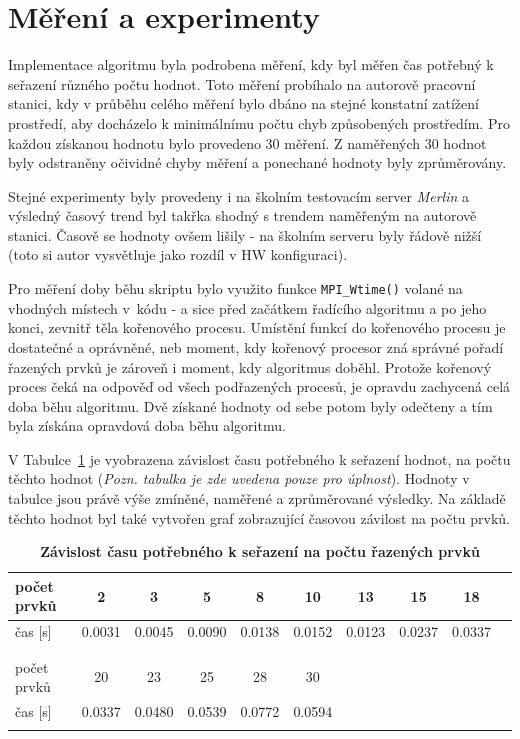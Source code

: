 \documentclass[a4paper,10pt]{article}
\begin{document}
	\section{Měření a experimenty}
	\label{sec:mereni}
		\par Implementace algoritmu byla podrobena měření, kdy byl měřen čas potřebný k seřazení různého počtu hodnot. Toto měření probíhalo na autorově pracovní stanici, kdy v průběhu celého měření bylo dbáno na stejné konstatní zatížení prostředí, aby docházelo k minimálnímu počtu chyb způsobených prostředím. Pro každou získanou hodnotu bylo provedeno 30 měření. Z naměřených 30 hodnot byly odstraněny očividné chyby měření a ponechané hodnoty byly zprůměrovány. 

		\par Stejné experimenty byly provedeny i na školním testovacím server \textit{Merlin} a výsledný časový trend byl takřka shodný s trendem naměřeným na autorově stanici. Časově se hodnoty ovšem lišily \-- na školním serveru byly řádově nižší (toto si autor vysvětluje jako rozdíl v HW konfiguraci).

		\par Pro měření doby běhu skriptu bylo využito funkce \texttt{MPI\_Wtime()} volané na vhodných místech v~kódu \-- a sice před začátkem řadícího algoritmu a po jeho konci, zevnitř těla kořenového procesu. Umístění funkcí do kořenového procesu je dostatečné a oprávněné, neb moment, kdy kořenový procesor zná správné pořadí řazených prvků je zároveň i moment, kdy algoritmus doběhl. Protože kořenový proces čeká na odpověď od všech podřazených procesů, je opravdu zachycená celá doba běhu algoritmu. Dvě získané hodnoty od sebe potom byly odečteny a tím byla získána opravdová doba běhu algoritmu. 
    	
    	\par V Tabulce~\ref{tab:1} je vyobrazena závislost času potřebného k seřazení hodnot, na počtu těchto hodnot (\textit{Pozn. tabulka je zde uvedena pouze pro úplnost}). Hodnoty v tabulce jsou právě výše zmíněné, naměřené a zprůměrované výsledky. Na základě těchto hodnot byl také vytvořen graf zobrazující časovou závilost na počtu prvků.


	\begin{table}[th]
		\centering
		\caption{\textbf{Závislost času potřebného k seřazení na počtu řazených prvků}}
		\label{my-label}
		\begin{tabular}{l||ccccccccc}
		 \hline \hline
		 počet prvků & 2 & 3 & 5 & 8 & 10 & 13 & 15 & 18 \\
		 \hline
		 čas [s]     & 0.0031 & 0.0045 & 0.0090 & 0.0138 & 0.0152 & 0.0123 & 0.0237 & 0.0337  \\
		   &    &    &    &    &   \\
		   &    &    &    &    &   \\
		 \hline
		 počet prvků  & 20 & 23 & 25 & 28 & 30 \\
		 \hline
		 čas [s]  & 0.0337 & 0.0480 & 0.0539 & 0.0772 & 0.0594 \\
		  \hline
		 \label{tab:1}
		\end{tabular}
	\end{table}
\end{document}
